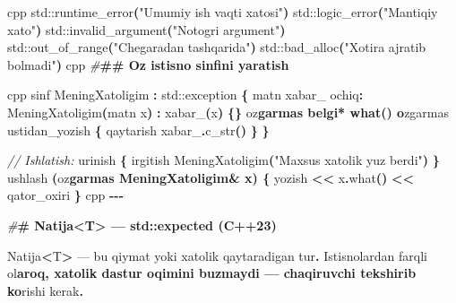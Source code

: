 \documentclass[a4paper,11pt,twoside,openright]{book}
\newenvironment{Shaded}{\begin{snugshade}}{\end{snugshade}}
\newcommand{\BuiltInTok}[1]{#1}
\newcommand{\CharTok}[1]{\textcolor[rgb]{0.31,0.60,0.02}{#1}}
\newcommand{\CommentTok}[1]{\textcolor[rgb]{0.56,0.35,0.01}{\textit{#1}}}
\newcommand{\ErrorTok}[1]{\textcolor[rgb]{0.64,0.00,0.00}{\textbf{#1}}}
\newcommand{\NormalTok}[1]{#1}
\newcommand{\OperatorTok}[1]{\textcolor[rgb]{0.81,0.36,0.00}{\textbf{#1}}}
\newcommand{\PreprocessorTok}[1]{\textcolor[rgb]{0.56,0.35,0.01}{\textit{#1}}}
\newcommand{\StringTok}[1]{\textcolor[rgb]{0.31,0.60,0.02}{#1}}
\newcommand{\VariableTok}[1]{\textcolor[rgb]{0.00,0.00,0.00}{#1}}
\begin{document}
\begin{Shaded}
\begin{Highlighting}[]
\ErrorTok{\textasciigrave{}\textasciigrave{}\textasciigrave{}}\NormalTok{cpp}
\BuiltInTok{std::}\NormalTok{runtime\_error}\OperatorTok{(}\StringTok{"Umumiy ish vaqti xatosi"}\OperatorTok{)}
\BuiltInTok{std::}\NormalTok{logic\_error}\OperatorTok{(}\StringTok{"Mantiqiy xato"}\OperatorTok{)}
\BuiltInTok{std::}\NormalTok{invalid\_argument}\OperatorTok{(}\StringTok{"Noto\textquotesingle{}g\textquotesingle{}ri argument"}\OperatorTok{)}
\BuiltInTok{std::}\NormalTok{out\_of\_range}\OperatorTok{(}\StringTok{"Chegaradan tashqarida"}\OperatorTok{)}
\BuiltInTok{std::}\NormalTok{bad\_alloc}\OperatorTok{(}\StringTok{"Xotira ajratib bo\textquotesingle{}lmadi"}\OperatorTok{)}
\ErrorTok{\textasciigrave{}\textasciigrave{}\textasciigrave{}}\NormalTok{cpp}
\PreprocessorTok{\#}\ErrorTok{\#\# O\textquotesingle{}z istisno sinfini yaratish}

\ErrorTok{\textasciigrave{}\textasciigrave{}\textasciigrave{}}\NormalTok{cpp}
\NormalTok{sinf MeningXatoligim }\OperatorTok{:} \BuiltInTok{std::}\NormalTok{exception }\OperatorTok{\{}
\NormalTok{    matn }\VariableTok{xabar\_}
\NormalTok{ochiq}\OperatorTok{:}
\NormalTok{    MeningXatoligim}\OperatorTok{(}\NormalTok{matn x}\OperatorTok{)} \OperatorTok{:} \VariableTok{xabar\_}\OperatorTok{(}\NormalTok{x}\OperatorTok{)} \OperatorTok{\{\}}
\NormalTok{    o}\CharTok{\textquotesingle{}z}\ErrorTok{garmas belgi* what() o}\CharTok{\textquotesingle{}}\NormalTok{zgarmas ustidan\_yozish }\OperatorTok{\{}
\NormalTok{        qaytarish }\VariableTok{xabar\_}\OperatorTok{.}\NormalTok{c\_str}\OperatorTok{()}
    \OperatorTok{\}}
\OperatorTok{\}}

\CommentTok{// Ishlatish:}
\NormalTok{urinish }\OperatorTok{\{}
\NormalTok{    irgitish MeningXatoligim}\OperatorTok{(}\StringTok{"Maxsus xatolik yuz berdi"}\OperatorTok{)}
\OperatorTok{\}}\NormalTok{ ushlash }\OperatorTok{(}\NormalTok{o}\CharTok{\textquotesingle{}z}\ErrorTok{garmas MeningXatoligim\& x) \{}
\NormalTok{    yozish }\OperatorTok{\textless{}\textless{}}\NormalTok{ x}\OperatorTok{.}\NormalTok{what}\OperatorTok{()} \OperatorTok{\textless{}\textless{}}\NormalTok{ qator\_oxiri}
\OperatorTok{\}}
\ErrorTok{\textasciigrave{}\textasciigrave{}\textasciigrave{}}\NormalTok{cpp}
\OperatorTok{{-}{-}{-}}

\PreprocessorTok{\#}\ErrorTok{\# \textasciigrave{}Natija\textless{}T\textgreater{}\textasciigrave{} — std::expected (C++23)}

\ErrorTok{\textasciigrave{}}\NormalTok{Natija}\OperatorTok{\textless{}}\NormalTok{T}\OperatorTok{\textgreater{}}\ErrorTok{\textasciigrave{}}\NormalTok{ — bu qiymat yoki xatolik qaytaradigan tur}\OperatorTok{.}\NormalTok{ Istisnolardan farqli o}\CharTok{\textquotesingle{}l}\ErrorTok{aroq, xatolik dastur oqimini buzmaydi — chaqiruvchi tekshirib ko}\CharTok{\textquotesingle{}}\NormalTok{rishi kerak}\OperatorTok{.}


\end{Highlighting}
\end{Shaded}
\end{document}
